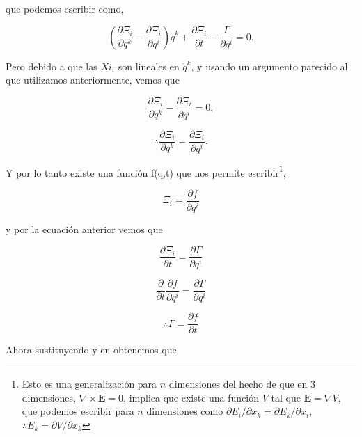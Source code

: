 \documentclass[a4paper,10pt]{article}
\numberwithin{equation}{section}
\begin{document}
que podemos escribir como,

\begin{equation}
 \left( \frac{\partial \Xi_i}{\partial q^k} - \frac{\partial \Xi_i}{\partial q^i}\right) \dot{q}^k
 + \frac{\partial \Xi_i}{\partial t} - \frac{\Gamma}{\partial q^i} = 0.
\end{equation}

Pero debido a que las $Xi_i$ son lineales en $\dot{q}^k$, y usando un argumento 
parecido al que utilizamos anteriormente, vemos que 

\begin{equation}
 \frac{\partial \Xi_i}{\partial q^k} - \frac{\partial \Xi_i}{\partial q^i} = 0,
\end{equation}

\begin{equation}
 \therefore \frac{\partial \Xi_i}{\partial q^k} = \frac{\partial \Xi_i}{\partial q^i}.
\end{equation}

Y por lo tanto existe una función f(q,t) que nos permite escribir\footnote{Esto es una 
generalización para $n$ dimensiones del hecho de que en 3 dimensiones, $\nabla \times \mathbf{E} = 0$,
implica que existe una función $V$ tal que $\mathbf{E} = \nabla V$, que podemos escribir para 
$n$ dimensiones como $\partial E_i / \partial x_k = \partial E_k / \partial x_i$, 
$\therefore E_k = \partial V / \partial x_k$},

\begin{equation}
 \Xi_i = \frac{\partial f}{\partial q^i}
 \label{eq:4xi2}
\end{equation}

y por la ecuación anterior vemos que 

\begin{equation}
 \frac{\partial \Xi_i}{\partial t} = \frac{\partial \Gamma}{\partial q^i}
\end{equation}

\begin{equation}
 \frac{\partial}{\partial t}\frac{\partial f}{\partial q^i} = \frac{\partial \Gamma}{\partial q^i}
\end{equation}

\begin{equation}
 \therefore \Gamma = \frac{\partial f}{\partial t}
 \label{eq:4gamma}
\end{equation}

Ahora sustituyendo  y  en  obtenemos que 
\end{document}
